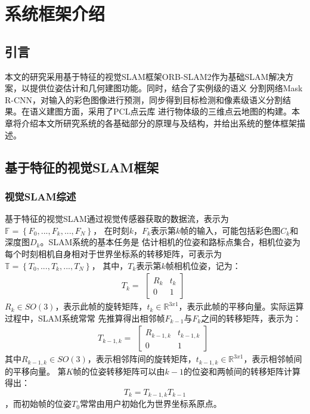 \chapter{系统框架介绍}\label{chap:framework}
\section{引言}
本文的研究采用基于特征的视觉SLAM框架ORB-SLAM2作为基础SLAM解决方案，以提供位姿估计和几何建图功能。同时，结合了实例级的语义
分割网络Mask R-CNN，对输入的彩色图像进行预测，同步得到目标检测和像素级语义分割结果。在语义建图方面，采用了PCL点云库\citep{rusu20113d}
进行物体级的三维点云地图的构建。本章将介绍本文所研究系统的各基础部分的原理与及结构，并给出系统的整体框架描述。
\section{基于特征的视觉SLAM框架}
\subsection{视觉SLAM综述}
基于特征的视觉SLAM通过视觉传感器获取的数据流，表示为$\mathbb{F}=\left\{F_{0},...,F_{k},...,F_{N}\right\}$，
在时刻$k$，$F_{k}$表示第$k$帧的输入，可能包括彩色图$C_{k}$和深度图$D_{k}$。SLAM系统的基本任务是
估计相机的位姿和路标点集合，相机位姿为每个时刻相机自身相对于世界坐标系的转移矩阵，可表示为$\mathbb{T}=\left\{T_{0},...,T_{k},...,T_{N} \right\}$，
其中，$T_{k}$表示第$k$帧相机位姿，记为：
$$T_{k}=
\begin{gathered}
\begin{bmatrix} R_{k} & t_{k} \\ 0 & 1 \end{bmatrix}
\end{gathered}
$$
$R_{k}\in SO\left(3\right)$，表示此帧的旋转矩阵，$t_{k}\in \mathbb{R}^{3x1}$，表示此帧的平移向量。实际运算过程中，SLAM系统常常
先推算得出相邻帧$F_{k-1}$与$F_{k}$之间的转移矩阵，表示为：
$$T_{k-1,k}=
\begin{gathered}
\begin{bmatrix} R_{k-1,k} & t_{k-1,k} \\ 0 & 1 \end{bmatrix}
\end{gathered}
$$
其中$R_{k-1,k}\in SO\left(3\right)$，表示相邻阵间的旋转矩阵，$t_{k-1,k}\in \mathbb{R}^{3x1}$，表示相邻帧间的平移向量。
第$K$帧的位姿转移矩阵可以由$k-1$的位姿和两帧间的转移矩阵计算得出：
$$T_{k}=T_{k-1,k}T_{k-1}$$，而初始帧的位姿$T_{0}$常常由用户初始化为世界坐标系原点。

